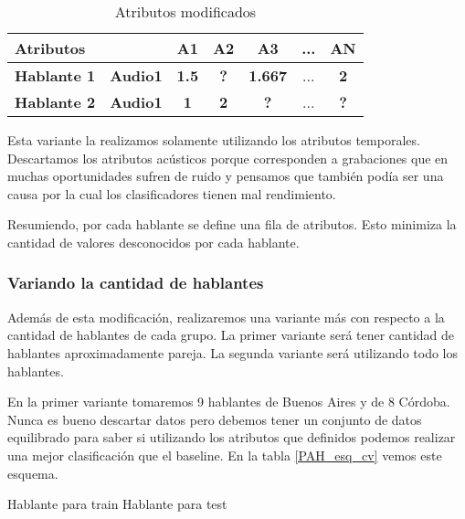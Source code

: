 \begin{table}[H]
	\centering
	\begin{tabular}{|l|l|ccccc|}
		\hline
		\multicolumn{2}{|l|}{Atributos} & A1 & A2 & A3 & ... & AN \\
		\hline 
		\textbf{Hablante 1} & \textbf{Audio1} & \textbf{1.5} & \textbf{?} & \textbf{1.667} & ... & \textbf{2}\\
		\hline
		\textbf{Hablante 2} & \textbf{Audio1} & \textbf{1} & \textbf{2} & \textbf{?} & ... & \textbf{?} \\
		\hline
	\end{tabular}
	\caption{Atributos modificados}
	\label{PAH_datos_comb}
\end{table}

Esta variante la realizamos solamente utilizando los atributos temporales. Descartamos los atributos acústicos porque corresponden a grabaciones que en muchas oportunidades sufren de ruido y pensamos que también podía ser una causa por la cual los clasificadores tienen mal rendimiento.

Resumiendo, por cada hablante se define una fila de atributos. Esto minimiza la cantidad de valores desconocidos por cada hablante.

\subsubsection*{Variando la cantidad de hablantes}

Además de esta modificación, realizaremos una variante más con respecto a la cantidad de hablantes de cada grupo. La primer variante será tener cantidad de hablantes aproximadamente pareja. La segunda variante será utilizando todo los hablantes.  

En la primer variante tomaremos 9 hablantes de Buenos Aires y de 8 Córdoba. Nunca es bueno descartar datos pero debemos tener un conjunto de datos equilibrado para saber si utilizando los atributos que definidos podemos realizar una mejor clasificación que el baseline. En la tabla \ref{PAH_esq_cv} vemos este esquema.

\begin{center}
	\mycirc[blue] Hablante para train \mycirc[red] Hablante para test
\end{center}

